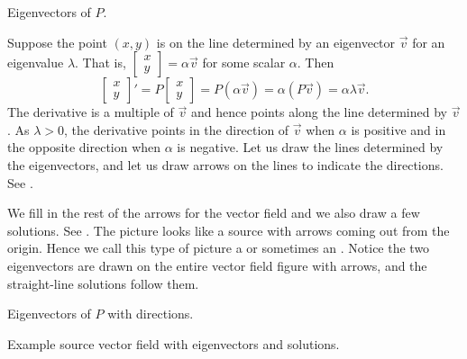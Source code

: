 \begin{mywrapfig}{3.25in}
\capstart
{}
\caption{Eigenvectors of $P$.\label{pln:source-eigfig}}
\end{mywrapfig}

Suppose the point $(x,y)$ is on the line determined by an eigenvector
$\vec{v}$ for an eigenvalue $\lambda$.
That is,
$\left[ \begin{smallmatrix} x \\ y \end{smallmatrix} \right] = \alpha \vec{v}$
for some scalar $\alpha$.
Then 
\begin{equation*}
\begin{bmatrix} x \\ y \end{bmatrix} '
=
P \begin{bmatrix} x \\ y \end{bmatrix}
=
P ( \alpha \vec{v} ) =  \alpha ( P \vec{v} )
= \alpha \lambda \vec{v} .
\end{equation*}
The derivative is a multiple of $\vec{v}$ and hence points along the
line determined by $\vec{v}$.  As $\lambda > 0$, the derivative points in the
direction of $\vec{v}$ when $\alpha$ is positive and in the opposite direction
when $\alpha$ is negative.  Let us draw the lines determined by
the eigenvectors, and let us draw
arrows on the lines to indicate the directions.
See .

We fill in the rest of the arrows for the vector field
and we also draw a few solutions.  See
.
The picture looks like a source
with arrows coming out from the origin.
Hence we call this type of picture a
\emph{} or sometimes an \emph{}. Notice the two eigenvectors are drawn on the entire vector field figure with arrows, and the straight-line solutions follow them.  

\begin{myfig}
\parbox[t]{3.0in}{
 \capstart
 \caption{Eigenvectors of $P$ with directions.\label{pln:source-eig-arrfig}}
}
\quad
\parbox[t]{3.0in}{
 \capstart
 \caption{Example source vector field with eigenvectors and
 solutions.\label{pln:source-fullfig}}
}
\end{myfig}

